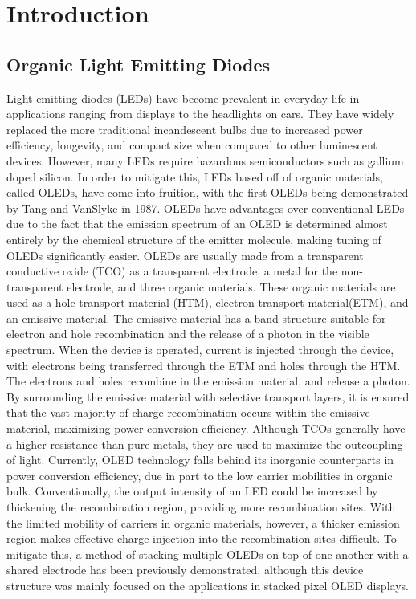 \documentclass{report}
\begin{document}
\tableofcontents

\chapter{Introduction} \label{intro}

    \section{Organic Light Emitting Diodes}
        Light emitting diodes (LEDs) have become prevalent in everyday life in applications ranging from displays to the headlights on cars. They have widely replaced the more traditional incandescent bulbs due to increased power efficiency, longevity, and compact size when compared to other luminescent devices. However, many LEDs require hazardous semiconductors such as gallium doped silicon.\cite{Lim2011} In order to mitigate this, LEDs based off of organic materials, called OLEDs, have come into fruition, with the first OLEDs being demonstrated by Tang and VanSlyke in 1987.\cite{Tang1987} OLEDs have advantages over conventional LEDs due to the fact that the emission spectrum of an OLED is determined almost entirely by the chemical structure of the emitter molecule, making tuning of OLEDs significantly easier. OLEDs are usually made from a transparent conductive oxide (TCO) as a transparent electrode, a metal for the non-transparent electrode, and three organic materials. These organic materials are used as a hole transport material (HTM), electron transport material(ETM), and an emissive material.\cite{Shinar2008} The emissive material has a band structure suitable for electron and hole recombination and the release of a photon in the visible spectrum. When the device is operated, current is injected through the device, with electrons being transferred through the ETM and holes through the HTM. The electrons and holes recombine in the emission material, and release a photon. By surrounding the emissive material with selective transport layers, it is ensured that the vast majority of charge recombination occurs within the emissive material, maximizing power conversion efficiency. Although TCOs generally have a higher resistance than pure metals, they are used to maximize the outcoupling of light. Currently, OLED technology falls behind its inorganic counterparts in power conversion efficiency, due in part to the low carrier mobilities in organic bulk.\cite{Shinar2008} Conventionally, the output intensity of an LED could be increased by thickening the recombination region, providing more recombination sites. With the limited mobility of carriers in organic materials, however, a thicker emission region makes effective charge injection into the recombination sites difficult. To mitigate this, a method of stacking multiple OLEDs on top of one another with a shared electrode has been previously demonstrated\cite{Gu1999}, although this device structure was mainly focused on the applications in stacked pixel OLED displays.
        
\end{document}
